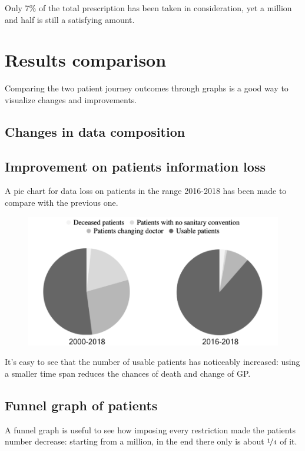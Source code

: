 Only 7\% of the total prescription has been taken in consideration, yet a million and half is still a satisfying amount.

\section{Results comparison}
Comparing the two patient journey outcomes through graphs is a good way to visualize changes and improvements.

\subsection{Changes in data composition}

\subsection{Improvement on patients information loss}
A pie chart for data loss on patients in the range 2016-2018 has been made to compare with the previous one.

\begin{figure}[h]
	\centering
	\includegraphics[scale=0.5]{immagini/pies.png}
\end{figure}

It's easy to see that the number of usable patients has noticeably increased: using a smaller time span reduces the chances of death and change of GP.

\subsection{Funnel graph of patients}
A funnel graph is useful to see how imposing every restriction made the patients number decrease: starting from a million, in the end there only is about $\nicefrac{1}{4}$ of it.







